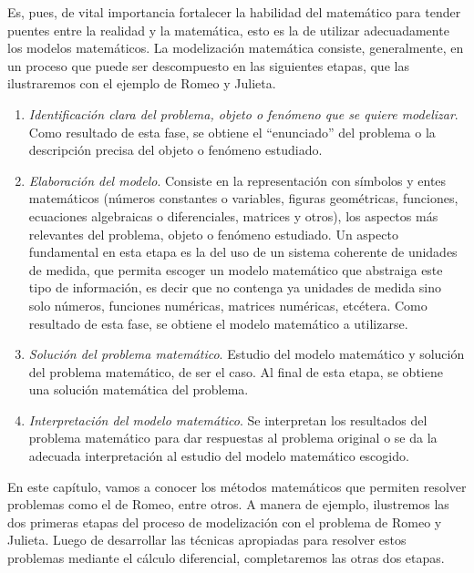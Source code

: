 Es, pues, de vital importancia fortalecer la habilidad del matemático para tender puentes entre la
realidad y la matemática, esto es la de utilizar adecuadamente los modelos matemáticos. La
modelización matemática consiste, generalmente, en un proceso que puede ser descompuesto en las
siguientes etapas, que las ilustraremos con el ejemplo de Romeo y Julieta.

\begin{enumerate}[leftmargin=*]
\item \emph{Identificación clara del problema, objeto o fenómeno que se quiere modelizar}. Como
    resultado de esta fase, se obtiene el ``enunciado'' del problema o la descripción precisa
    del objeto o fenómeno estudiado.

\item \emph{Elaboración del modelo}. Consiste en la representación con símbolos y entes
    matemáticos (números constantes o variables, figuras geométricas, funciones, ecuaciones
    algebraicas o diferenciales, matrices y otros), los aspectos más relevantes del problema,
    objeto o fenómeno estudiado. Un aspecto fundamental en esta etapa es la del uso de un
    sistema coherente de unidades de medida, que permita escoger un modelo matemático que
    abstraiga este tipo de información, es decir que no contenga ya unidades de medida sino
    solo números, funciones numéricas, matrices numéricas, etcétera. Como resultado de esta
    fase, se obtiene el modelo matemático a utilizarse.

\item \emph{Solución del problema matemático}. Estudio del modelo matemático y solución del
    problema matemático, de ser el caso. Al final de esta etapa, se obtiene una solución
    matemática del problema.

\item \emph{Interpretación del modelo matemático}. Se interpretan los resultados del problema
    matemático para dar respuestas al problema original o se da la adecuada interpretación al
    estudio del modelo matemático escogido.

\end{enumerate}

En este capítulo, vamos a conocer los métodos matemáticos que permiten resolver problemas como el
de Romeo, entre otros. A manera de ejemplo, ilustremos las dos primeras etapas del proceso de
modelización con el problema de Romeo y Julieta. Luego de desarrollar las técnicas apropiadas para
resolver estos problemas mediante el cálculo diferencial, completaremos las otras dos etapas.


